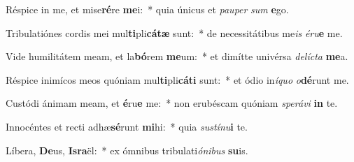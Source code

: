 \item Réspice in me, et mise\textbf{ré}re \textbf{me}i:~* quia únicus et \textit{pau}\textit{per} \textit{sum} \textbf{e}go.
\item Tribulatiónes cordis mei mul\textbf{ti}pli\textbf{cá}\textbf{tæ} sunt:~* de necessitátibus me\textit{is} \textit{é}\textit{ru}\textbf{e} me.
\item Vide humilitátem meam, et la\textbf{bó}rem \textbf{me}um:~* et dimítte univérsa \textit{de}\textit{líc}\textit{ta} \textbf{me}a.
\item Réspice inimícos meos quóniam mul\textbf{ti}pli\textbf{cá}\textbf{ti} sunt:~* et ódio in\textit{í}\textit{quo} \textit{o}\textbf{dé}runt me.
\item Custódi ánimam meam, et \textbf{é}ru\textbf{e} me:~* non erubéscam quóniam \textit{spe}\textit{rá}\textit{vi} \textbf{in} te.
\item Innocéntes et recti adhæ\textbf{sé}runt \textbf{mi}hi:~* quia \textit{sus}\textit{tí}\textit{nu}\textbf{i} te.
\item Líbera, \textbf{De}us, \textbf{Is}\textbf{ra}ël:~* ex ómnibus tribulati\textit{ó}\textit{ni}\textit{bus} \textbf{su}is.
